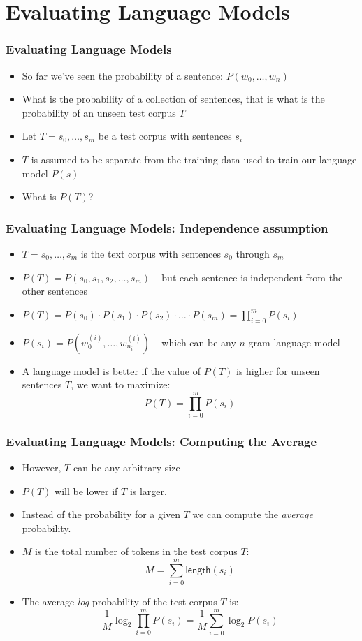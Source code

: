 \section{Evaluating Language Models}
\frame{\tableofcontents[currentsection]}

\begin{frame}
\frametitle{Evaluating Language Models}
\begin{itemize}[<+->]
\item So far we've seen the probability of a sentence: $P(w_0, \ldots, w_n)$
\item What is the probability of a collection of sentences, that is what is the probability of an unseen test corpus $T$
\item Let $T = s_0, \ldots, s_m$ be a test corpus with sentences $s_i$
\item $T$ is assumed to be separate from the training data used to train our language model $P(s)$
\item What is $P(T)$?
\end{itemize}
\end{frame}

\begin{frame}
\frametitle{Evaluating Language Models: Independence assumption}
\begin{itemize}[<+->]
\item $T = s_0, \ldots, s_m$ is the text corpus with sentences $s_0$ through $s_m$
\item $P(T) = P(s_0, s_1, s_2, \ldots, s_m)$ -- but each sentence is independent from the other sentences
\item $P(T) = P(s_0) \cdot P(s_1) \cdot P(s_2) \cdot \ldots \cdot P(s_m) = \prod_{i=0}^m P(s_i)$ 
\item $P(s_i) = P(w_0^{(i)}, \ldots, w_{n_i}^{(i)})$ -- which can be any $n$-gram language model
\item A language model is better if the value of $P(T)$ is higher for unseen sentences $T$, we want to maximize:
\[ P(T) = \prod_{i=0}^m P(s_i) \]
\end{itemize}
\end{frame}

\begin{frame}
\frametitle{Evaluating Language Models: Computing the Average}
\begin{itemize}[<+->]
\item However, $T$ can be any arbitrary size
\item $P(T)$ will be lower if $T$ is larger.
\item Instead of the probability for a given $T$ we can compute the {\em average} probability.
\item $M$ is the total number of tokens in the test corpus $T$:
\[ M = \sum_{i=0}^m \textsf{length}(s_i) \]
\item The average {\em log} probability of the test corpus $T$ is:
\[ \frac{1}{M} \log_2 \prod_{i=0}^m P(s_i) = \frac{1}{M} \sum_{i=0}^m \log_2 P(s_i) \]
\end{itemize}
\end{frame}

